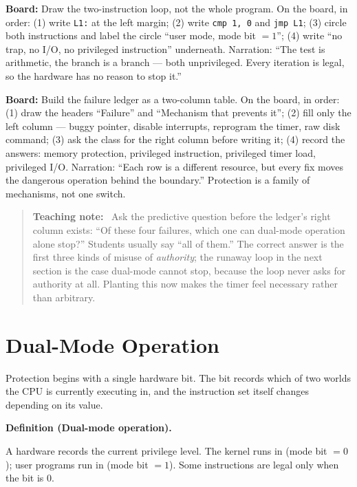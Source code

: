 \documentclass[11pt]{article}
\newenvironment{definitionbox}[1]{%
  \par\noindent\textbf{Definition (#1).}\ \itshape
}{\par\vspace{0.3em}}
\newenvironment{teachingaside}{\begin{quote}\small\color{primary-gold}\textbf{Teaching note:}\ }{\end{quote}}
\begin{document}
\noindent\textbf{Board:} Draw the two-instruction loop, not the whole program. On the board, in order: (1) write \texttt{L1:} at the left margin; (2) write \texttt{cmp 1, 0} and \texttt{jmp L1}; (3) circle both instructions and label the circle ``user mode, mode bit $=1$''; (4) write ``no trap, no I/O, no privileged instruction'' underneath. Narration: ``The test is arithmetic, the branch is a branch --- both unprivileged. Every iteration is legal, so the hardware has no reason to stop it.''

\noindent\textbf{Board:} Build the failure ledger as a two-column table. On the board, in order: (1) draw the headers ``Failure'' and ``Mechanism that prevents it''; (2) fill only the left column --- buggy pointer, disable interrupts, reprogram the timer, raw disk command; (3) ask the class for the right column before writing it; (4) record the answers: memory protection, privileged instruction, privileged timer load, privileged I/O. Narration: ``Each row is a different resource, but every fix moves the dangerous operation behind the boundary.'' Protection is a family of mechanisms, not one switch.

\begin{teachingaside}
Ask the predictive question before the ledger's right column exists: ``Of these four failures, which one can dual-mode operation alone stop?'' Students usually say ``all of them.'' The correct answer is the first three kinds of misuse of \emph{authority}; the runaway loop in the next section is the case dual-mode cannot stop, because the loop never asks for authority at all. Planting this now makes the timer feel necessary rather than arbitrary.
\end{teachingaside}

\section{Dual-Mode Operation}

Protection begins with a single hardware bit. The bit records which of two worlds the CPU is currently executing in, and the instruction set itself changes depending on its value.

\begin{definitionbox}{Dual-mode operation}
A hardware  records the current privilege level. The kernel runs in  (mode bit $=0$); user programs run in  (mode bit $=1$). Some instructions are legal only when the bit is $0$.
\end{definitionbox}
\end{document}
